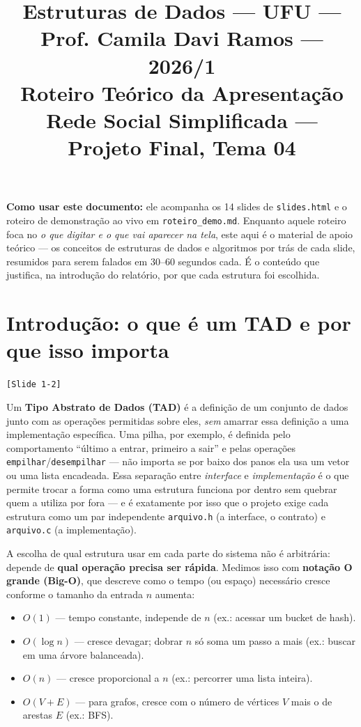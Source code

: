 \documentclass[11pt,a4paper]{article}
\title{
  \vspace{-2cm}
  {\Large\textcolor{inksoft}{Estruturas de Dados --- UFU --- Prof. Camila Davi Ramos --- 2026/1}}\\[0.6cm]
  {\huge\bfseries\color{accent} Roteiro Teórico da Apresentação}\\[0.3cm]
  {\Large Rede Social Simplificada --- Projeto Final, Tema 04}
}
\author{}
\date{}
\newcommand{\slideref}[1]{\textcolor{accentwarm}{\texttt{[Slide #1]}}}
\newcommand{\code}[1]{\texttt{#1}}
\begin{document}
\maketitle
\thispagestyle{fancy}

\noindent\textbf{Como usar este documento:} ele acompanha os 14 slides de
\texttt{slides.html} e o roteiro de demonstração ao vivo em
\texttt{roteiro\_demo.md}. Enquanto aquele roteiro foca no \emph{o que digitar
e o que vai aparecer na tela}, este aqui é o material de apoio teórico --- os
conceitos de estruturas de dados e algoritmos por trás de cada slide,
resumidos para serem falados em 30--60 segundos cada. É o conteúdo que
justifica, na introdução do relatório, por que cada estrutura foi escolhida.

\tableofcontents
\vspace{0.4cm}

\section{Introdução: o que é um TAD e por que isso importa}
\slideref{1-2}

Um \textbf{Tipo Abstrato de Dados (TAD)} é a definição de um conjunto de
dados junto com as operações permitidas sobre eles, \emph{sem} amarrar essa
definição a uma implementação específica. Uma pilha, por exemplo, é definida
pelo comportamento ``último a entrar, primeiro a sair'' e pelas operações
\code{empilhar}/\code{desempilhar} --- não importa se por baixo dos panos ela
usa um vetor ou uma lista encadeada. Essa separação entre \emph{interface} e
\emph{implementação} é o que permite trocar a forma como uma estrutura
funciona por dentro sem quebrar quem a utiliza por fora --- e é exatamente
por isso que o projeto exige cada estrutura como um par independente
\code{arquivo.h} (a interface, o contrato) e \code{arquivo.c} (a
implementação).

A escolha de qual estrutura usar em cada parte do sistema não é arbitrária:
depende de \textbf{qual operação precisa ser rápida}. Medimos isso com
\textbf{notação O grande (Big-O)}, que descreve como o tempo (ou espaço)
necessário cresce conforme o tamanho da entrada $n$ aumenta:

\begin{itemize}
  \item $O(1)$ --- tempo constante, independe de $n$ (ex.: acessar um bucket de hash).
  \item $O(\log n)$ --- cresce devagar; dobrar $n$ só soma um passo a mais (ex.: buscar em uma árvore balanceada).
  \item $O(n)$ --- cresce proporcional a $n$ (ex.: percorrer uma lista inteira).
  \item $O(V+E)$ --- para grafos, cresce com o número de vértices $V$ mais o de arestas $E$ (ex.: BFS).
\end{itemize}
\end{document}
